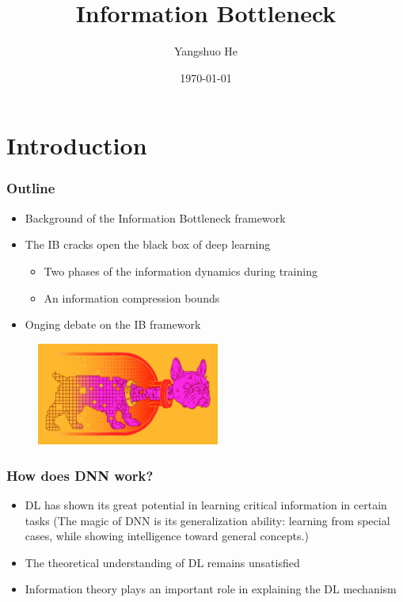 \documentclass{beamer}
\title %
{Information Bottleneck}
\subtitle{}
\author[Yangshuo He] %
{Yangshuo He}
\institute[UoM] %
{
    The University of Melbourne
    \and
    Department of Electrical and Electronic Engineering
}
\date{\today}
\begin{document}
\frame{\titlepage}

\section{Introduction}

\begin{frame}
\frametitle{Outline}
\begin{itemize}
    \item Background of the Information Bottleneck framework
    \item The IB cracks open the black box of deep learning
    \begin{itemize}
        \item Two phases of the information dynamics during training
        \item An information compression bounds
    \end{itemize}
    \item Onging debate on the IB framework
\end{itemize}
\begin{figure}
    \centering
    \includegraphics[width=6cm]{IB_dog.jpg}
\end{figure}
\end{frame}





\begin{frame}
    \frametitle{How does DNN work?}
    \begin{itemize}
        \item DL has shown its great potential in learning critical information in certain tasks (The magic of DNN is its generalization ability: learning from special cases, while showing intelligence toward general concepts.)
        \item The theoretical understanding of DL remains unsatisfied 
        \item Information theory plays an important role in explaining the DL mechanism 
    \end{itemize}
\end{frame}
\end{document}
